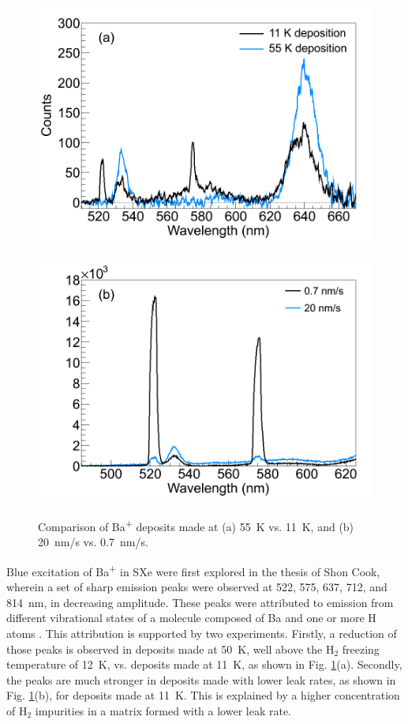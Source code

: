 \begin{figure} %
        \centering
                \includegraphics[width=.5\textwidth]{figures/BaHx_a.png}
                ~
                \includegraphics[width=.5\textwidth]{figures/BaHx_b.png}
                \caption{Comparison of Ba\textsuperscript{+} deposits made at (a) 55~K vs. 11~K, and (b) 20~nm/s vs. 0.7~nm/s.\cite{Mong2015}}
\label{fig:BaHx}
\end{figure}

Blue excitation of Ba\textsuperscript{+} in SXe were first explored in the thesis of Shon Cook, wherein a set of sharp emission peaks were observed at 522, 575, 637, 712, and 814~nm, in decreasing amplitude.  These peaks were attributed to emission from different vibrational states of a molecule composed of Ba and one or more H atoms \cite{Shon}.  This attribution is supported by two experiments.  Firstly, a reduction of those peaks is observed in deposits made at 50~K, well above the H$_{2}$ freezing temperature of 12~K, vs. deposits made at 11~K, as shown in Fig. \ref{fig:BaHx}(a).  Secondly, the peaks are much stronger in deposits made with lower leak rates, as shown in Fig. \ref{fig:BaHx}(b), for deposits made at 11~K.  This is explained by a higher concentration of H$_{2}$ impurities in a matrix formed with a lower leak rate.

